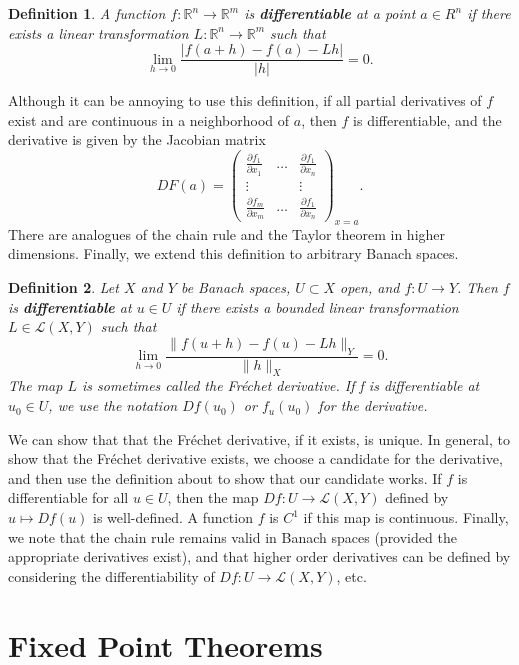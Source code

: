 \documentclass[12pt]{amsart}         %
\newtheorem{definition}{Definition}[section]
\theoremstyle{remark}
\newcommand{\R}{\mathbb{R}}
\begin{document}
\begin{definition}
A function $f:\R^n \rightarrow \R^m$ is \textbf{differentiable} at a point $a \in R^n$ if there exists a linear transformation $L: \R^n \rightarrow \R^m$ such that
\[
\lim_{h \rightarrow 0}\frac{|f(a + h) - f(a) - L h |}{|h|} = 0.
\]
\end{definition}

Although it can be annoying to use this definition, if all partial derivatives of $f$ exist and are continuous in a neighborhood of $a$, then $f$ is differentiable, and the derivative is given by the Jacobian matrix
\[
DF(a) = \begin{pmatrix}
\frac{\partial f_1}{\partial x_1} & \dots & \frac{\partial f_1}{\partial x_n} \\
\vdots && \vdots \\
\frac{\partial f_m}{\partial x_m} & \dots & \frac{\partial f_1}{\partial x_n} 
\end{pmatrix}_{x = a}.
\]
There are analogues of the chain rule and the Taylor theorem in higher dimensions. Finally, we extend this definition to arbitrary Banach spaces.

\begin{definition}
Let $X$ and $Y$ be Banach spaces, $U \subset X$ open, and $f \colon U \rightarrow Y$. Then $f$ is \textbf{differentiable} at $u \in U$ if there exists a bounded linear transformation $L \in \mathcal{L}(X, Y)$ such that
\[
\lim_{h \rightarrow 0} \frac{ \|f(u + h) - f(u) - Lh \|_Y}{\|h\|_X} = 0.
\]
The map $L$ is sometimes called the Fr\'{e}chet derivative. If f is differentiable at $u_0 \in U$, we use the notation $Df(u_0)$ or $f_u(u_0)$ for the derivative.
\end{definition}

We can show that that the Fr\'{e}chet derivative, if it exists, is unique. In general, to show that the Fr\'{e}chet derivative exists, we choose a candidate for the derivative, and then use the definition about to show that our candidate works. If $f$ is differentiable for all $u \in U$, then the map $Df\colon U \rightarrow \mathcal{L}(X,Y)$ defined by $u \mapsto Df(u)$ is well-defined. A function $f$ is $C^1$ if this map is continuous. Finally, we note that the chain rule remains valid in Banach spaces (provided the appropriate derivatives exist), and that higher order derivatives can be defined by considering the differentiability of $Df: U \rightarrow \mathcal{L}(X,Y)$, etc.

\section{Fixed Point Theorems}
\end{document}
